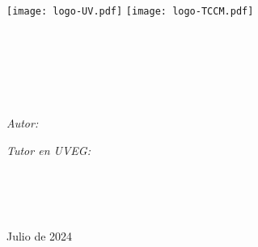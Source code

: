 \graphicspath{{./front-page/figures/}}
\begin{titlepage}
\begin{center}

\vfill
\texttt{[image: logo-UV.pdf]} \hspace{0.4cm}
\texttt{[image: logo-TCCM.pdf]}\\[1cm]
{\scshape\LARGE \univname\par}\vspace{0.3cm} %
\textsc{\Large \facultyname}\\[0.3cm] %
\Large \worktype\\ [0.2cm]

\HRule \\[0.4cm] %
{\Large \bfseries \ttitle\par}\vspace{0.4cm} %
\HRule \\[0.5cm] %

\begin{minipage}[t]{0.45\textwidth}
\begin{flushleft} \large
\emph{Autor:}\\
\authorname %
\end{flushleft}
\end{minipage}
\begin{minipage}[t]{0.45\textwidth}
\begin{flushright} \large
\emph{Tutor en UVEG:} \\
\supname %
\end{flushright}
\end{minipage}\\[1.5cm]

\vfill


\large
\deptname\\[0cm] %
\institutename\\[0cm] %


{\large Julio de 2024}\\[4cm] %

\end{center}
\end{titlepage}
